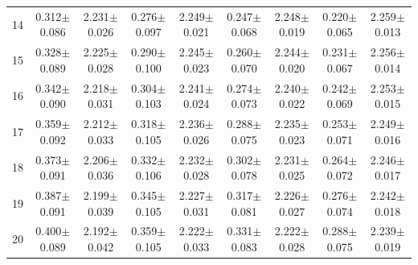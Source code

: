 \begin{table}[H]
{\begin{tabular}{c cc cc cc cc}
14 & 0.312$\pm$0.086 & 2.231$\pm$0.026 & 0.276$\pm$0.097 & 2.249$\pm$0.021 & 0.247$\pm$0.068 & 2.248$\pm$0.019 & 0.220$\pm$0.065 & 2.259$\pm$0.013 \\
15 & 0.328$\pm$0.089 & 2.225$\pm$0.028 & 0.290$\pm$0.100 & 2.245$\pm$0.023 & 0.260$\pm$0.070 & 2.244$\pm$0.020 & 0.231$\pm$0.067 & 2.256$\pm$0.014 \\
16 & 0.342$\pm$0.090 & 2.218$\pm$0.031 & 0.304$\pm$0.103 & 2.241$\pm$0.024 & 0.274$\pm$0.073 & 2.240$\pm$0.022 & 0.242$\pm$0.069 & 2.253$\pm$0.015 \\
17 & 0.359$\pm$0.092 & 2.212$\pm$0.033 & 0.318$\pm$0.105 & 2.236$\pm$0.026 & 0.288$\pm$0.075 & 2.235$\pm$0.023 & 0.253$\pm$0.071 & 2.249$\pm$0.016 \\
18 & 0.373$\pm$0.091 & 2.206$\pm$0.036 & 0.332$\pm$0.106 & 2.232$\pm$0.028 & 0.302$\pm$0.078 & 2.231$\pm$0.025 & 0.264$\pm$0.072 & 2.246$\pm$0.017 \\
19 & 0.387$\pm$0.091 & 2.199$\pm$0.039 & 0.345$\pm$0.105 & 2.227$\pm$0.031 & 0.317$\pm$0.081 & 2.226$\pm$0.027 & 0.276$\pm$0.074 & 2.242$\pm$0.018 \\
20 & 0.400$\pm$0.089 & 2.192$\pm$0.042 & 0.359$\pm$0.105 & 2.222$\pm$0.033 & 0.331$\pm$0.083 & 2.222$\pm$0.028 & 0.288$\pm$0.075 & 2.239$\pm$0.019 \\

\bottomrule

\end{tabular}
}
\end{table}
